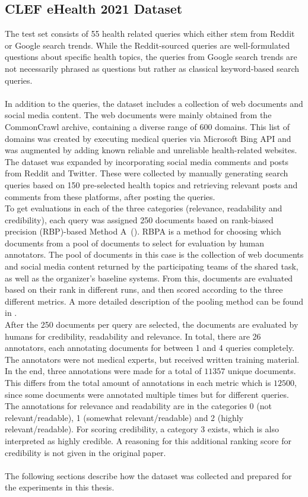 \subsection{CLEF eHealth 2021 Dataset}
The test set consists of 55 health related queries which either stem from Reddit or Google search trends.
While the Reddit-sourced queries are well-formulated questions about specific health topics, the queries from Google search trends are not necessarily phrased as questions but rather as classical keyword-based search queries.
\\
\\
In addition to the queries, the dataset includes a collection of web documents and social media content.
The web documents were mainly obtained from the CommonCrawl archive, containing a diverse range of 600 domains.
This list of domains was created by executing medical queries via Microsoft Bing API and was augmented by adding known reliable and unreliable health-related websites.
The dataset was expanded by incorporating social media comments and posts from Reddit and Twitter.
These were collected by manually generating search queries based on 150 pre-selected health topics and retrieving relevant posts and comments from these platforms, after posting the queries.
\\
To get evaluations in each of the three categories (relevance, readability and credibility), each query was assigned 250 documents based on rank-biased precision (RBP)-based Method A~(\cite{moffat:2008:Rank}).
RBPA is a method for choosing which documents from a pool of documents to select for evaluation by human annotators.
The pool of documents in this case is the collection of web documents and social media content returned by the participating teams of the shared task, as well as the organizer's baseline systems.
From this, documents are evaluated based on their rank in different runs, and then scored according to the three different metrics.
A more detailed description of the pooling method can be found in \cite{lipani:2017:Fixed}.
\\
After the 250 documents per query are selected, the documents are evaluated by humans for credibility, readability and relevance.
In total, there are 26 annotators, each annotating documents for between 1 and 4 queries completely.
The annotators were not medical experts, but received written training material.
In the end, three annotations were made for  a total of $11 357$ unique documents.
This differs from the total amount of annotations in each metric which is $12 500$, since some documents were annotated multiple times but for different queries.
\\
The annotations for relevance and readability are in the categories 0 (not relevant/readable), 1 (somewhat relevant/readable) and 2 (highly relevant/readable).
For scoring credibility, a category 3 exists, which is also interpreted as highly credible.
A reasoning for this additional ranking score for credibility is not given in the original paper.
\\\\
The following sections describe how the dataset was collected and prepared for the experiments in this thesis.
